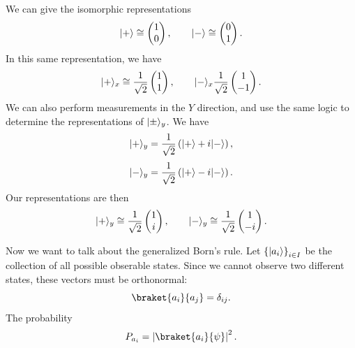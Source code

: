 We can give the isomorphic representations
\[
	\lvert+\rangle\cong \begin{pmatrix}
	1 \\
	0
\end{pmatrix},\qquad \lvert-\rangle\cong \begin{pmatrix}
0 \\
1
\end{pmatrix}
.\]
In this same representation, we have
\[
	\lvert+\rangle_x \cong \frac{1}{\sqrt{2} } \begin{pmatrix}
	1 \\
	1
	\end{pmatrix},\qquad \lvert-\rangle_x\frac{1}{\sqrt{2} } \begin{pmatrix}
	1 \\
	-1
	\end{pmatrix}
.\]
We can also perform measurements in the $Y$ direction, and use the same logic to determine the representations of $\lvert\pm\rangle_y$. We have
\[
	\lvert+\rangle_y = \frac{1}{\sqrt{2} } \left( \lvert+\rangle+i\lvert-\rangle \right ) ,
\]
\[
	\lvert-\rangle_y = \frac{1}{\sqrt{2} } \left( \lvert+\rangle-i\lvert-\rangle \right ) 
.\]
Our representations are then
\[
	\lvert+\rangle_y \cong \frac{1}{\sqrt{2} } \begin{pmatrix}
	1 \\
	i
\end{pmatrix},\qquad \lvert-\rangle_y \cong \frac{1}{\sqrt{2} } \begin{pmatrix}
1 \\
-i
\end{pmatrix}
.\]

Now we want to talk about the generalized Born's rule. Let $\left\{ \lvert a_i\rangle \right\}_{i\in I} $ be the collection of all possible obserable states. Since we cannot observe two different states, these vectors must be orthonormal:
\[
	\braket{a_i}{a_j}=\delta_{ij} 
.\]
The probability
\[
	P_{a_i} =\left| \braket{a_i}{\psi } \right| ^2
.\]

